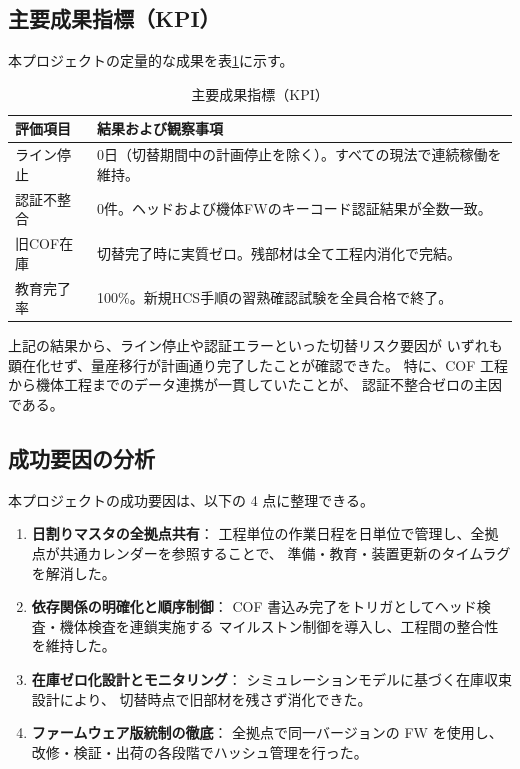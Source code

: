\documentclass[journal,twocolumn]{IEEEtran}
\begin{document}
\subsection{主要成果指標（KPI）}
本プロジェクトの定量的な成果を表\ref{tab:result}に示す。

\begin{table}[t]
\caption{主要成果指標（KPI）}
\label{tab:result}
\centering
\begin{tabularx}{\columnwidth}{@{}l X@{}}
\toprule
評価項目 & 結果および観察事項 \\
\midrule
ライン停止 & 0日（切替期間中の計画停止を除く）。すべての現法で連続稼働を維持。 \\[2pt]
認証不整合 & 0件。ヘッドおよび機体FWのキーコード認証結果が全数一致。 \\[2pt]
旧COF在庫 & 切替完了時に実質ゼロ。残部材は全て工程内消化で完結。 \\[2pt]
教育完了率 & 100\%。新規HCS手順の習熟確認試験を全員合格で終了。 \\
\bottomrule
\end{tabularx}
\end{table}

上記の結果から、ライン停止や認証エラーといった切替リスク要因が
いずれも顕在化せず、量産移行が計画通り完了したことが確認できた。
特に、COF 工程から機体工程までのデータ連携が一貫していたことが、
認証不整合ゼロの主因である。

\subsection{成功要因の分析}
本プロジェクトの成功要因は、以下の 4 点に整理できる。

\begin{enumerate}
  \item \textbf{日割りマスタの全拠点共有}：  
  工程単位の作業日程を日単位で管理し、全拠点が共通カレンダーを参照することで、
  準備・教育・装置更新のタイムラグを解消した。
  
  \item \textbf{依存関係の明確化と順序制御}：  
  COF 書込み完了をトリガとしてヘッド検査・機体検査を連鎖実施する
  マイルストン制御を導入し、工程間の整合性を維持した。
  
  \item \textbf{在庫ゼロ化設計とモニタリング}：  
  シミュレーションモデルに基づく在庫収束設計により、
  切替時点で旧部材を残さず消化できた。
  
  \item \textbf{ファームウェア版統制の徹底}：  
  全拠点で同一バージョンの FW を使用し、
  改修・検証・出荷の各段階でハッシュ管理を行った。
\end{enumerate}
\end{document}

